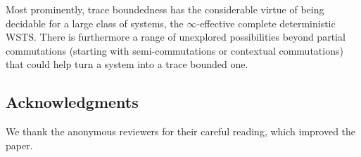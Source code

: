 \documentclass[11pt,reqno,a4paper]{amsart}
\theoremstyle{plain}
\theoremstyle{definition}
\theoremstyle{remark}
\begin{document}
Most prominently, trace boundedness has the
considerable virtue of being decidable for a large class of systems,
the $\infty$-effective complete deterministic WSTS.  There is
furthermore a range of unexplored possibilities beyond partial
commutations (starting with semi-commutations or contextual
commutations) that could help turn a system into a trace bounded one.

\subsection*{Acknowledgments}
We thank the anonymous reviewers for their careful reading, which
improved the paper.



\end{document}
